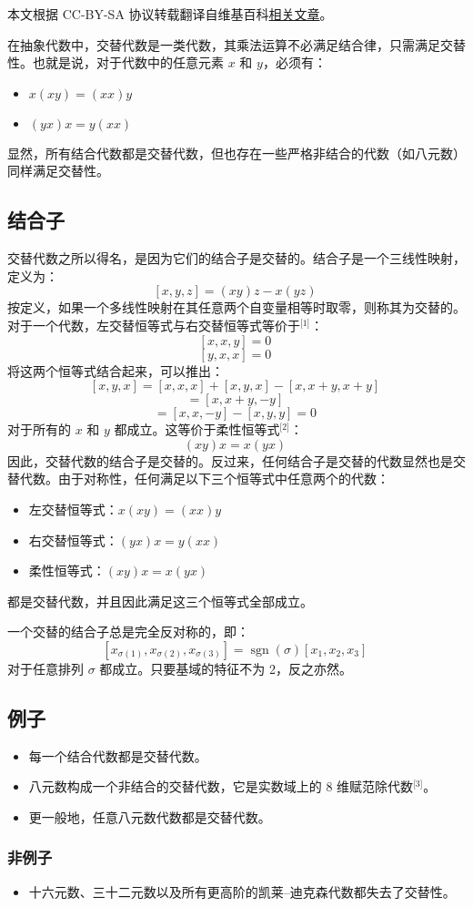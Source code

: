 
本文根据 CC-BY-SA 协议转载翻译自维基百科\href{https://en.wikipedia.org/wiki/Alternative_algebra}{相关文章}。

在抽象代数中，交替代数是一类代数，其乘法运算不必满足结合律，只需满足交替性。也就是说，对于代数中的任意元素 $x$ 和 $y$，必须有：
\begin{itemize}
\item $x(xy) = (xx)y$
\item $(yx)x = y(xx)$
\end{itemize}
显然，所有结合代数都是交替代数，但也存在一些严格非结合的代数（如八元数）同样满足交替性。
\subsection{结合子}
交替代数之所以得名，是因为它们的结合子是交替的。结合子是一个三线性映射，定义为：
$$
[x, y, z] = (xy)z - x(yz)~
$$
按定义，如果一个多线性映射在其任意两个自变量相等时取零，则称其为交替的。对于一个代数，左交替恒等式与右交替恒等式等价于\(^\text{[1]}\)：
$$
[x, x, y] = 0~
$$
$$
[y, x, x] = 0~
$$
将这两个恒等式结合起来，可以推出：
$$
[x, y, x] = [x, x, x] + [x, y, x] - [x, x+y, x+y]~
$$
$$
= [x, x+y, -y]~
$$
$$
= [x, x, -y] - [x, y, y] = 0~
$$
对于所有的 $x$ 和 $y$ 都成立。这等价于柔性恒等式\(^\text{[2]}\)：
$$
(xy)x = x(yx)~
$$
因此，交替代数的结合子是交替的。反过来，任何结合子是交替的代数显然也是交替代数。由于对称性，任何满足以下三个恒等式中任意两个的代数：
\begin{itemize}
\item 左交替恒等式：$x(xy) = (xx)y$
\item 右交替恒等式：$(yx)x = y(xx)$
\item 柔性恒等式：$(xy)x = x(yx)$
\end{itemize}
都是交替代数，并且因此满足这三个恒等式全部成立。

一个交替的结合子总是完全反对称的，即：
$$
[x_{\sigma(1)}, x_{\sigma(2)}, x_{\sigma(3)}] = \operatorname{sgn}(\sigma) [x_1, x_2, x_3]~
$$
对于任意排列 $\sigma$ 都成立。只要基域的特征不为 2，反之亦然。
\subsection{例子}
\begin{itemize}
\item 每一个结合代数都是交替代数。
\item 八元数构成一个非结合的交替代数，它是实数域上的 8 维赋范除代数\(^\text{[3]}\)。
\item 更一般地，任意八元数代数都是交替代数。
\end{itemize}
\subsubsection{非例子}
\begin{itemize}
\item 十六元数、三十二元数以及所有更高阶的凯莱–迪克森代数都失去了交替性。
\end{itemize}